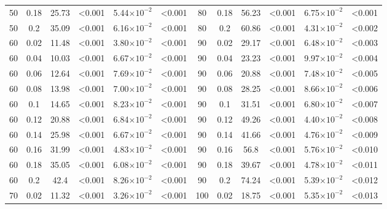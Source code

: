 \documentclass[12pt]{article}
\begin{document}
\begin{table}[hb!]
\begin{tabular}{c c | c c| c c ||c c | c c | c c |}
            50  & 0.18  & 25.73 & \textless0.001  & 5.44$\times10^{-2}$ & \textless0.001  & 80  & 0.18  & 56.23 & \textless0.001  & 6.75$\times10^{-2}$ & \textless0.001  \\
            50  & 0.2 & 35.09 & \textless0.001  & 6.16$\times10^{-2}$ & \textless0.001  & 80  & 0.2 & 60.86 & \textless0.001  & 4.31$\times10^{-2}$ & \textless0.002  \\
            60  & 0.02  & 11.48 & \textless0.001  & 3.80$\times10^{-2}$ & \textless0.001  & 90  & 0.02  & 29.17 & \textless0.001  & 6.48$\times10^{-2}$ & \textless0.003  \\
            60  & 0.04  & 10.03 & \textless0.001  & 6.67$\times10^{-2}$ & \textless0.001  & 90  & 0.04  & 23.23 & \textless0.001  & 9.97$\times10^{-2}$ & \textless0.004  \\
            60  & 0.06  & 12.64 & \textless0.001  & 7.69$\times10^{-2}$ & \textless0.001  & 90  & 0.06  & 20.88 & \textless0.001  & 7.48$\times10^{-2}$ & \textless0.005  \\
            60  & 0.08  & 13.98 & \textless0.001  & 7.00$\times10^{-2}$ & \textless0.001  & 90  & 0.08  & 28.25 & \textless0.001  & 8.66$\times10^{-2}$ & \textless0.006  \\
            60  & 0.1 & 14.65 & \textless0.001  & 8.23$\times10^{-2}$ & \textless0.001  & 90  & 0.1 & 31.51 & \textless0.001  & 6.80$\times10^{-2}$ & \textless0.007  \\
            60  & 0.12  & 20.88 & \textless0.001  & 6.84$\times10^{-2}$ & \textless0.001  & 90  & 0.12  & 49.26 & \textless0.001  & 4.40$\times10^{-2}$ & \textless0.008  \\
            60  & 0.14  & 25.98 & \textless0.001  & 6.67$\times10^{-2}$ & \textless0.001  & 90  & 0.14  & 41.66 & \textless0.001  & 4.76$\times10^{-2}$ & \textless0.009  \\
            60  & 0.16  & 31.99 & \textless0.001  & 4.83$\times10^{-2}$ & \textless0.001  & 90  & 0.16  & 56.8  & \textless0.001  & 5.76$\times10^{-2}$ & \textless0.010  \\
            60  & 0.18  & 35.05 & \textless0.001  & 6.08$\times10^{-2}$ & \textless0.001  & 90  & 0.18  & 39.67 & \textless0.001  & 4.78$\times10^{-2}$ & \textless0.011  \\
            60  & 0.2 & 42.4  & \textless0.001  & 8.26$\times10^{-2}$ & \textless0.001  & 90  & 0.2 & 74.24 & \textless0.001  & 5.39$\times10^{-2}$ & \textless0.012  \\
            70  & 0.02  & 11.32 & \textless0.001  & 3.26$\times10^{-2}$ & \textless0.001  & 100 & 0.02  & 18.75 & \textless0.001  & 5.35$\times10^{-2}$ & \textless0.013  \\

\end{tabular}
\end{table}
\end{document}
